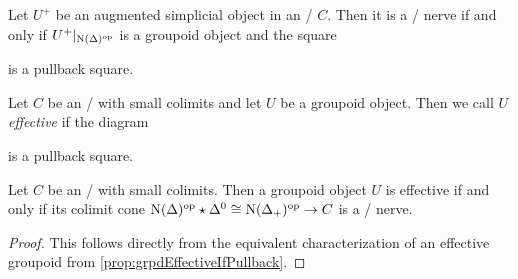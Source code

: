 \begin{prop}\label{prop:grpdEffectiveIfPullback} 
    Let $U^+$ be an augmented simplicial object in an \inftycat/ $C$.
    Then it is a \Cech/ nerve if and only if $U^+|_{\operatorname{N}(\Delta)^{\operatorname{op}}}$ is a groupoid object and the square
    \begin{center}
    \end{center}
    is a pullback square.
    \begin{reference}
        \cite[Proposition 6.1.2.11]{HTT}
    \end{reference}
\end{prop}
\begin{definition}
    Let $C$ be an \inftycat/ with small colimits and let $U$ be a groupoid object.
    Then we call $U$ \emph{effective} if the diagram 
    \begin{center}
    \end{center}
    is a pullback square.
\end{definition}
\begin{corollary}\label{cor:groupoidEffectiveIffColimCechNerve}
    Let $C$ be an \inftycat/ with small colimits. 
    Then a groupoid object $U$ is effective if and only if its colimit cone $\operatorname{N}(\Delta)^{\operatorname{op}}\star\Delta^0\cong\operatorname{N}(\Delta_+)^{\operatorname{op}}\to C$ is a \Cech/ nerve.
    \begin{proof}
        This follows directly from the equivalent characterization of an effective groupoid from \cref{prop:grpdEffectiveIfPullback}.
    \end{proof}
\end{corollary}
